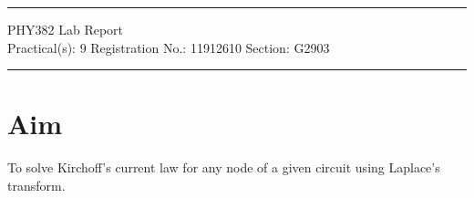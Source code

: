 \documentclass[11pt]{article}
\begin{document}
	
	\author{Aayush Arya}
	\date{(Submitted: \today)}
	\title{}
	
	\maketitle
	
	\hrule
	\begin{center}
		PHY382 Lab Report\\
		Practical(s): 9 \quad Registration No.: 11912610 \quad Section: G2903
	\end{center}
	\hrule
	
	\section*{Aim}
To solve Kirchoff’s current law for any node of a given circuit using Laplace’s transform.
\end{document}
